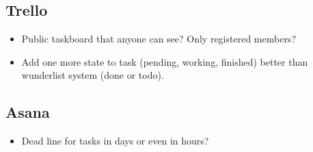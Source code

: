 \subsection{Trello}

\begin{itemize}
\item Public taskboard that anyone can see? Only registered members?
\item Add one more state to task (pending, working, finished) better than wunderlist system (done or todo).
\end{itemize}

\subsection{Asana}
\begin{itemize}
 \item  Dead line for tasks in days or even in hours?
\end{itemize}
